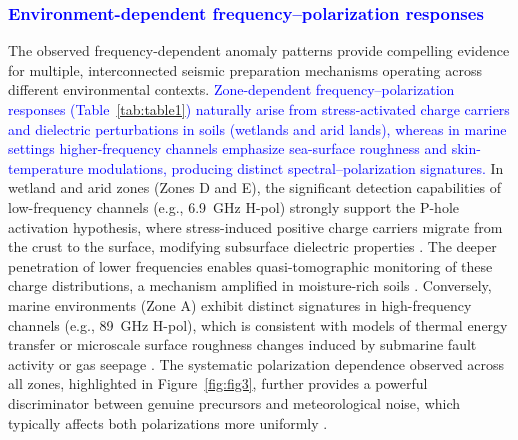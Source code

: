 \documentclass[preprint,review,12pt,authoryear]{elsarticle}
\providecommand{\DIFaddtex}[1]{{\sf #1}} %
\providecommand{\DIFaddbegin}{} %
\providecommand{\DIFaddend}{} %
\providecommand{\DIFadd}[1]{\texorpdfstring{\DIFaddtex{#1}}{#1}} %
\newcommand{\DIFaddincludegraphics}[2][]{{\color{blue}\fbox{\DIFOincludegraphics[#1]{#2}}}} %
\DeclareRobustCommand{\DIFaddbegin}{\DIFOaddbegin \let\includegraphics\DIFaddincludegraphics} %
\DeclareRobustCommand{\DIFaddend}{\DIFOaddend \let\includegraphics\DIFOincludegraphics} %
\renewcommand{\DIFaddtex}[1]{\textcolor{blue}{#1}}
\begin{document}
\DIFaddbegin \subsubsection{\DIFadd{Environment-dependent frequency--polarization responses}}
\DIFaddend The observed frequency-dependent anomaly patterns provide compelling evidence for multiple, interconnected seismic preparation mechanisms operating across different environmental contexts. \DIFaddbegin \DIFadd{Zone-dependent frequency--polarization responses (Table~\ref{tab:table1}) naturally arise from stress-activated charge carriers and dielectric perturbations in soils (wetlands and arid lands), whereas in marine settings higher-frequency channels emphasize sea-surface roughness and skin-temperature modulations, producing distinct spectral--polarization signatures. }\DIFaddend In wetland and arid zones (Zones D and E), the significant detection capabilities of low-frequency channels (e.g., 6.9\DIFaddbegin \DIFadd{~}\DIFaddend GHz H-pol) strongly support the P-hole activation hypothesis, where stress-induced positive charge carriers migrate from the crust to the surface, modifying subsurface dielectric properties \citep{freundPreearthquakeSignalsUnderlying2011,maoImpactCompressiveStress2020}. The deeper penetration of lower frequencies enables quasi-tomographic monitoring of these charge distributions, a mechanism amplified in moisture-rich soils \citep{jingChangesSurfaceWater2022}. Conversely, marine environments (Zone A) exhibit distinct signatures in high-frequency channels (e.g., 89\DIFaddbegin \DIFadd{~}\DIFaddend GHz H-pol), which is consistent with models of thermal energy transfer or microscale surface roughness changes induced by submarine fault activity or gas seepage \citep{liuGeneralFeaturesMultiparameter2023}. The systematic polarization dependence observed across all zones, highlighted in Figure~\ref{fig:fig3}, further provides a powerful discriminator between genuine precursors and meteorological noise, which typically affects both polarizations more uniformly \citep{lixinProgressesPossibleFrontiers2022}.
\end{document}
